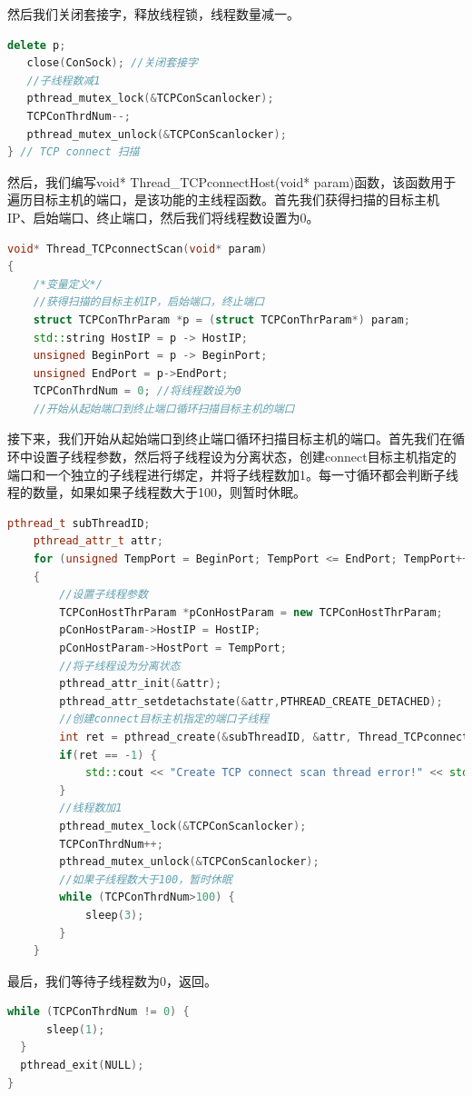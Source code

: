 \documentclass[UTF8,a4paper,10pt]{ctexart}
\begin{document}
然后我们关闭套接字，释放线程锁，线程数量减一。
\begin{lstlisting}[language = C++]
   delete p;
   close(ConSock); //关闭套接字
   //子线程数减1
   pthread_mutex_lock(&TCPConScanlocker);
   TCPConThrdNum--;
   pthread_mutex_unlock(&TCPConScanlocker);
} // TCP connect 扫描
\end{lstlisting}
然后，我们编写void* Thread\_TCPconnectHost(void* param)函数，该函数用于遍历目标主机的端口，是该功能的主线程函数。首先我们获得扫描的目标主机IP、启始端口、终止端口，然后我们将线程数设置为0。
\begin{lstlisting}[language = C++]
void* Thread_TCPconnectScan(void* param)
{
    /*变量定义*/
    //获得扫描的目标主机IP，启始端口，终止端口
    struct TCPConThrParam *p = (struct TCPConThrParam*) param;
    std::string HostIP = p -> HostIP;
    unsigned BeginPort = p -> BeginPort;
    unsigned EndPort = p->EndPort;
    TCPConThrdNum = 0; //将线程数设为0
    //开始从起始端口到终止端口循环扫描目标主机的端口
\end{lstlisting}
接下来，我们开始从起始端口到终止端口循环扫描目标主机的端口。首先我们在循环中设置子线程参数，然后将子线程设为分离状态，创建connect目标主机指定的端口和一个独立的子线程进行绑定，并将子线程数加1。每一寸循环都会判断子线程的数量，如果如果子线程数大于100，则暂时休眠。
\begin{lstlisting}[language = C++]
   pthread_t subThreadID;
	pthread_attr_t attr;
    for (unsigned TempPort = BeginPort; TempPort <= EndPort; TempPort++)
    {
        //设置子线程参数
        TCPConHostThrParam *pConHostParam = new TCPConHostThrParam;
        pConHostParam->HostIP = HostIP;
        pConHostParam->HostPort = TempPort;
        //将子线程设为分离状态
        pthread_attr_init(&attr);
        pthread_attr_setdetachstate(&attr,PTHREAD_CREATE_DETACHED);
        //创建connect目标主机指定的端口子线程
        int ret = pthread_create(&subThreadID, &attr, Thread_TCPconnectHost, pConHostParam);
        if(ret == -1) {
            std::cout << "Create TCP connect scan thread error!" << std::endl;
        }
        //线程数加1
        pthread_mutex_lock(&TCPConScanlocker);
        TCPConThrdNum++;
        pthread_mutex_unlock(&TCPConScanlocker);
        //如果子线程数大于100，暂时休眠
        while (TCPConThrdNum>100) {
            sleep(3); 
        }
    } 
\end{lstlisting}
最后，我们等待子线程数为0，返回。
\begin{lstlisting}[language = C++]
   while (TCPConThrdNum != 0) {
      sleep(1);
  }
  pthread_exit(NULL);
} 
\end{lstlisting}
\end{document}
